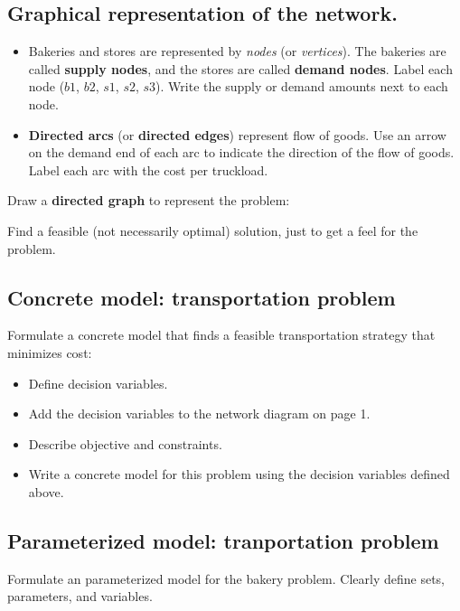 \documentclass[11pt]{article}
\theoremstyle{definition}
\begin{document}
\subsection{Graphical representation of the network.}
\begin{itemize}
\item Bakeries and stores are represented by \emph{nodes} (or \emph{vertices}).  The bakeries are called \textbf{supply nodes}, and the stores are called \textbf{demand nodes}.  Label each node ($b1$, $b2$, $s1$, $s2$, $s3$).    Write the supply or demand amounts next to each node. 
\item \textbf{Directed arcs} (or \textbf{directed edges}) represent flow of goods.  Use an arrow on the demand end of each arc to indicate the direction of the flow of goods.  Label each arc with the cost per truckload.  
\end{itemize}

Draw a \textbf{directed graph} to represent the problem:

\newpage
Find a feasible (not necessarily optimal) solution, just to get a feel for the problem.  \vspace{1 in}


\subsection{Concrete model: transportation problem}
Formulate a concrete model that finds a feasible transportation strategy that minimizes cost:
\begin{itemize}

\item  Define decision variables.  
\vspace{1 in}

\item  Add the decision variables to the network diagram on page 1.

\item Describe objective and constraints.
\vspace{1.5in}
\item Write a concrete model for this problem using the decision variables defined above. 
\end{itemize}

\newpage
\subsection{Parameterized model: tranportation problem}
Formulate an parameterized model for the bakery problem. Clearly define sets, parameters, and variables.
\end{document}
